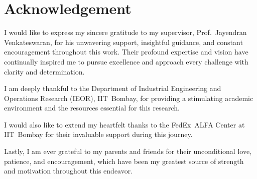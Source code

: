 \chapter*{\Large \center Acknowledgement}

I would like to express my sincere gratitude to my supervisor, Prof.~Jayendran Venkateswaran, for his unwavering support, insightful guidance, and constant encouragement throughout this work. Their profound expertise and vision have continually inspired me to pursue excellence and approach every challenge with clarity and determination.

I am deeply thankful to the Department of Industrial Engineering and Operations Research (IEOR), IIT~Bombay, for providing a stimulating academic environment and the resources essential for this research. 

I would also like to extend my heartfelt thanks to the FedEx~ALFA Center at IIT~Bombay for their invaluable support during this journey.

Lastly, I am ever grateful to my parents and friends for their unconditional love, patience, and encouragement, which have been my greatest source of strength and motivation throughout this endeavor.


